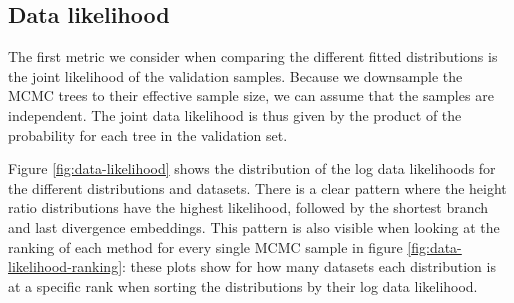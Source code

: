 \documentclass[10pt,letterpaper]{article}
\begin{document}
\subsection*{Data likelihood}

The first metric we consider when comparing the different fitted distributions is the joint likelihood of the validation samples. Because we downsample the MCMC trees to their effective sample size, we can assume that the samples are independent. The joint data likelihood is thus given by the product of the probability for each tree in the validation set.

Figure \ref{fig:data-likelihood} shows the distribution of the log data likelihoods for the different distributions and datasets. There is a clear pattern where the height ratio distributions have the highest likelihood, followed by the shortest branch and last divergence embeddings. This pattern is also visible when looking at the ranking of each method for every single MCMC sample in figure \ref{fig:data-likelihood-ranking}: these plots show for how many datasets each distribution is at a specific rank when sorting the distributions by their log data likelihood.
\end{document}
